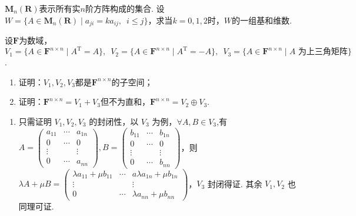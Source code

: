 \begin{exercise}
\begin{exgroup}
\begin{answer}
        \end{answer}

        \item $\mathbf{M}_n(\mathbf{R})$表示所有实$n$阶方阵构成的集合. 设$W=\{A\in \mathbf{M}_n(\mathbf{R}) \mid a_{ji}=ka_{ij},\enspace i \leqslant j\}$，求当$k=0,1,2$时，$W$的一组基和维数.
        \begin{answer}

        \end{answer}

        \item 设$\mathbf{F}$为数域，$V_1=\{A\in\mathbf{F}^{n\times n} \mid A^\mathrm{T}=A\},\enspace
            V_2=\{A\in\mathbf{F}^{n\times n} \mid A^\mathrm{T}=-A\},\enspace V_3=\{A\in\mathbf{F}^{n\times n} \mid A\text{~为上三角矩阵}\}$.
        \begin{enumerate}
            \item 证明：$V_1,V_2,V_3$都是$\mathbf{F}^{n\times n}$的子空间；

            \item 证明：$\mathbf{F}^{n\times n}=V_1+V_3$但不为直和，$\mathbf{F}^{n\times n}=V_2\oplus V_3$.
        \end{enumerate}

       \begin{answer}
        \begin{enumerate}
            \item 只需证明 $V_1,V_2,V_3$ 的封闭性，以 $V_3$ 为例，$\forall A,B\in V_3$,有 $A=\begin{pmatrix}
                          a_{11} & \cdots & a_{1n} \\
                          0      & \cdots & 0      \\
                          \vdots &        & \vdots \\
                          0      & \cdots & a_{nn}
                      \end{pmatrix},B=\begin{pmatrix}
                          b_{11} & \cdots & b_{1n} \\
                          0      & \cdots & 0      \\
                          \vdots &        & \vdots \\
                          0      & \cdots & b_{nn}
                      \end{pmatrix}$，则 $\lambda A+\mu B=\begin{pmatrix}
                          \lambda a_{11}+\mu b_{11} & \cdots & a\lambda a_{1n}+\mu b_{1n} \\
                          \vdots                    &        & \vdots                     \\
                          0                         & \cdots & \lambda a_{nn}+\mu b_{nn}
                      \end{pmatrix}$，$V_3$ 封闭得证. 其余 $V_1,V_2$ 也同理可证.


\end{enumerate}
\end{answer}
\end{exgroup}
\end{exercise}
